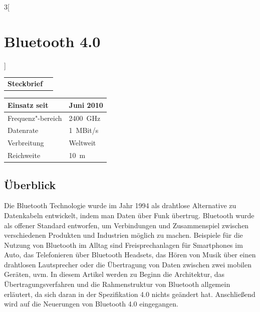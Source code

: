 \begin{multicols}{3}[\section{Bluetooth 4.0}]


\newrefsegment

\begin{boxedminipage}{\linewidth}
\begin{tabular}{p{}p{2.7 cm}}
\textbf{Steckbrief}& \\
\end{tabular}
\begin{tabular}{p{}|p{2.7 cm}}
      Einsatz seit & Juni 2010\\
      \hline
      Frequenz"-bereich  & \SI{2400}{\giga\hertz}\\
      \hline
      Datenrate & \SI{1}{MBit/s}\\
      \hline
      Verbreitung & Weltweit\\
      \hline
      Reichweite & \SI{10}{\metre}\\
\end{tabular}
\end{boxedminipage}
\par
\subsection*{Überblick}
Die Bluetooth Technologie wurde im Jahr 1994 als drahtlose Alternative zu Datenkabeln entwickelt, indem man Daten über Funk übertrug. Bluetooth wurde als offener Standard entworfen, um Verbindungen und Zusammenspiel zwischen verschiedenen Produkten und Industrien möglich zu machen.\cite{Bluetooth_4.1} Beispiele für die Nutzung von Bluetooth im Alltag sind Freisprechanlagen für Smartphones im Auto, das Telefonieren über Bluetooth Headsets, das Hören von Musik über einen drahtlosen Lautsprecher oder die Übertragung von Daten zwischen zwei mobilen Geräten, uvm. In diesem Artikel werden zu Beginn die Architektur, das Übertragungsverfahren und die Rahmenstruktur von Bluetooth allgemein erläutert, da sich daran in der Spezifikation 4.0 nichts geändert hat. Anschließend wird auf die Neuerungen von Bluetooth 4.0 eingegangen.


\end{multicols}

